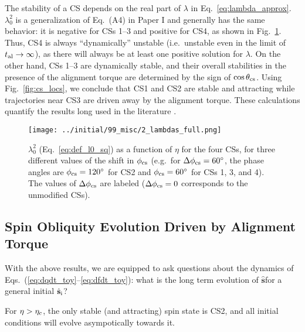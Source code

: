 \documentclass[
        fleqn,
        usenatbib,
        referee
    ]{mnras}
\newcommand*{\uv}[1]{\hat{\boldsymbol{\mathbf{#1}}}}
\newlength{\colummwidth}
\begin{document}
The stability of a CS depends on the real part of $\lambda$ in
Eq.~\eqref{eq:lambda_approx}. $\lambda_0^2$ is a generalization of Eq.~(A4)
in Paper I and generally has the same behavior: it is negative for CSs
1--3 and positive for CS4, as shown in Fig.~\ref{fig:lambda_full}. Thus, CS4 is
always ``dynamically'' unstable (i.e.\ unstable even in the limit of $t_{\rm al}
\to \infty$), as there will always be at least one positive solution for
$\lambda$. On the other hand, CSs 1--3 are dynamically stable, and their overall
stabilities in the presence of the alignment torque are determined by the
sign of $\cos \theta_{\rm cs}$. Using Fig.~\ref{fig:cs_locs}, we conclude that
CS1 and CS2 are stable and attracting while trajectories near CS3 are driven
away by the alignment torque. These calculations quantify the results long used
in the literature \citep[e.g.][]{ward1975tidal, fabrycky_otides}.
\begin{figure}
    \centering
    \texttt{[image: ../initial/99\_misc/2\_lambdas\_full.png]}
    \caption{$\lambda_0^2$ (Eq.~\ref{eq:def_l0_sq}) as a function of $\eta$ for
    the four CSs, for three different values of the shift in $\phi_{\rm cs}$
    (e.g.\ for $\Delta \phi_{\rm cs} = 60^\circ$, the phase angles are
    $\phi_{\rm cs} = 120^\circ$ for CS2 and $\phi_{\rm cs} = 60^\circ$ for CSs
    1, 3, and 4). The values of $\Delta \phi_{\rm cs}$ are labeled ($\Delta
    \phi_{\rm cs} = 0$ corresponds to the unmodified CSs).
    }\label{fig:lambda_full}
\end{figure}

\subsection{Spin Obliquity Evolution Driven by Alignment
Torque}\label{ss:toy_outcomes}

With the above results, we are equipped to ask questions about the dynamics of
Eqs.~(\ref{eq:dqdt_toy}--\ref{eq:dfdt_toy}): what is the long term evolution of
$\uv{s}$for a general initial $\uv{s}_{\rm i}$?

For $\eta > \eta_{\rm c}$, the only stable (and attracting) spin state is CS2,
and all initial conditions will evolve asympotically towards it.
\end{document}
